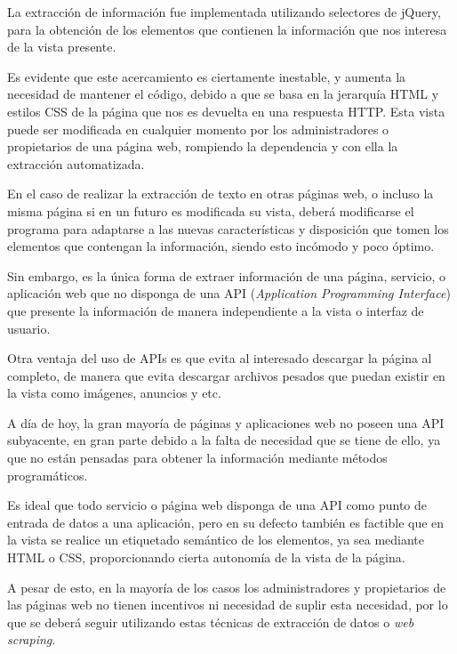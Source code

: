 La extracción de información fue implementada utilizando selectores de jQuery, para la obtención de los elementos que contienen la información que nos interesa de la vista presente.

Es evidente que este acercamiento es ciertamente inestable, y aumenta la necesidad de mantener el código, debido a que se basa en la jerarquía HTML y estilos CSS de la página que nos es devuelta en una respuesta HTTP. Esta vista puede ser modificada en cualquier momento por los administradores o propietarios de una página web, rompiendo la dependencia y con ella la extracción automatizada. 

En el caso de realizar la extracción de texto en otras páginas web, o incluso la misma página si en un futuro es modificada su vista, deberá modificarse el programa para adaptarse a las nuevas características y disposición que tomen los elementos que contengan la información, siendo esto incómodo y poco óptimo.

Sin embargo, es la única forma de extraer información de una página, servicio, o aplicación web que no disponga de una API (\textit{Application Programming Interface}) que presente la información de manera independiente a la vista o interfaz de usuario.

Otra ventaja del uso de APIs es que evita al interesado descargar la página al completo, de manera que evita descargar archivos pesados que puedan existir en la vista como imágenes, anuncios y etc.

%


A día de hoy, la gran mayoría de páginas y aplicaciones web no poseen una API subyacente, en gran parte debido a la falta de necesidad que se tiene de ello, ya que no están pensadas para obtener la información mediante métodos programáticos.

Es ideal que todo servicio o página web disponga de una API como punto de entrada de datos a una aplicación, pero en su defecto también es factible que en la vista se realice un etiquetado semántico de los elementos, ya sea mediante HTML o CSS, proporcionando cierta autonomía de la vista de la página.

A pesar de esto, en la mayoría de los casos los administradores y propietarios de las páginas web no tienen incentivos ni necesidad de suplir esta necesidad, por lo que se deberá seguir utilizando estas técnicas de extracción de datos o \textit{web scraping}.